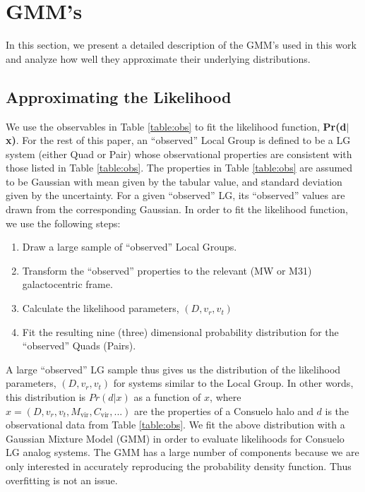 \documentclass[iop,apj,twocolappendix,numberedappendix]{emulateapj}
\newcommand{\LikePR}{\textbf{Pr(d$\vert$x)}}
\newcommand{\consuelo}{{\sc Consuelo }}
\begin{document}
\section{GMM's}
\label{sec:gmm_gof_app}

In this section, we present a detailed description of the GMM's used in this work and analyze how well they approximate their underlying distributions. 

\subsection{Approximating the Likelihood}
\label{sec:lhood_app}


We use the observables in Table \ref{table:obs} to fit the likelihood function, \LikePR. For the rest of this paper, an ``observed'' Local Group is defined to be a LG system (either Quad or Pair) whose observational properties are consistent with those listed in Table \ref{table:obs}. The properties in Table \ref{table:obs} are assumed to be Gaussian with mean given by the tabular value, and standard deviation given by the uncertainty. For a given ``observed'' LG, its ``observed'' values are drawn from the corresponding Gaussian. In order to fit the likelihood function, we use the following steps:

\begin{enumerate}
\item Draw a large sample of ``observed'' Local Groups.
\item Transform the ``observed'' properties to the relevant (MW or M31) galactocentric frame.
\item Calculate the likelihood parameters, $(D,v_{r},v_{t})$
\item Fit the resulting nine (three) dimensional probability distribution for the ``observed'' Quads (Pairs).
\end{enumerate}

A large ``observed'' LG sample thus gives us the distribution of the likelihood parameters, $(D,v_{r},v_{t})$ for systems similar to the Local Group. In other words, this distribution is $Pr(d\vert x)$ as a function of $x$, where $x=(D,v_{r},v_{t},M_{\text{vir}},C_{\text{vir}},...)$ are the properties of a \consuelo halo and $d$ is the observational data from Table \ref{table:obs}. We fit the above distribution with a Gaussian Mixture Model (GMM) in order to evaluate likelihoods for \consuelo LG analog systems. The GMM has a large number of components because we are only interested in accurately reproducing the probability density function. Thus overfitting is not an issue.
\end{document}
